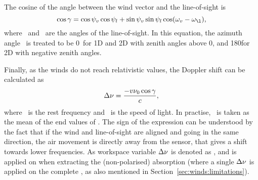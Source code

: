 The cosine of the angle between the wind vector and the line-of-sight is
\begin{equation}
  \cos\gamma = \cos\aZntAng{\Wind}\cos\aZntAng{l} + 
               \sin\aZntAng{\Wind}\sin\aZntAng{l}
               \cos(\aAzmAng{\Wind}-\aAzmAng{\l}),
  \label{eq:winds:dang}
\end{equation}
where \ and \ are the angles of the line-of-sight. In
this equation, the azimuth angle \ is treated to be 0\degree\ for 1D
and 2D with zenith angles above 0, and 180\degree for 2D with negative zenith
angles.

Finally, as the winds do not reach relativistic values, the Doppler shift can
be calculated as
\begin{equation}
  \Delta\nu = \frac{-v\nu_{0}\cos\gamma}{c},
\end{equation}
where \ is the rest frequency and \speedoflight\ is the speed of light.
In practise, \ is taken as the mean of the end values of
. The sign of the expression can be understood by the fact
that if the wind and line-of-sight are aligned and going in the same direction,
the air movement is directly away from the sensor, that gives a shift towards
lower frequencies. As workspace variable $\Delta\nu$ is denoted as
, and is applied on  when extracting
the (non-polarised) absorption (where a single $\Delta\nu$ is applied on the
complete , as also mentioned in
Section~\ref{sec:winds:limitations}).

